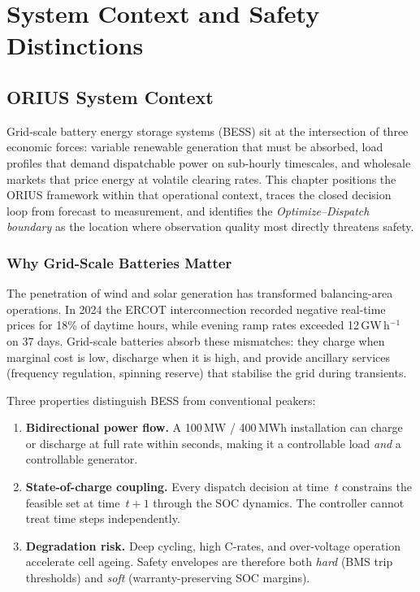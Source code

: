 \chapter{System Context and Safety Distinctions}
\label{ch:ch03_background}


\section{ORIUS System Context}
\label{ch:orius-context}

Grid-scale battery energy storage systems (BESS) sit at the intersection of
three economic forces: variable renewable generation that must be absorbed,
load profiles that demand dispatchable power on sub-hourly timescales, and
wholesale markets that price energy at volatile clearing rates.  This chapter
positions the ORIUS framework within that operational context, traces the
closed decision loop from forecast to measurement, and identifies the
\emph{Optimize--Dispatch boundary} as the location where observation quality
most directly threatens safety.

\subsection{Why Grid-Scale Batteries Matter}

The penetration of wind and solar generation has transformed balancing-area
operations.  In 2024 the ERCOT interconnection recorded negative real-time
prices for 18\% of daytime hours, while evening ramp rates exceeded
12\,GW\,h$^{-1}$ on 37 days.  Grid-scale batteries absorb these mismatches:
they charge when marginal cost is low, discharge when it is high, and provide
ancillary services (frequency regulation, spinning reserve) that stabilise the
grid during transients.

Three properties distinguish BESS from conventional peakers:
\begin{enumerate}
  \item \textbf{Bidirectional power flow.}  A 100\,MW / 400\,MWh installation
    can charge or discharge at full rate within seconds, making it a
    controllable load \emph{and} a controllable generator.
  \item \textbf{State-of-charge coupling.}  Every dispatch decision at time~$t$
    constrains the feasible set at time~$t+1$ through the SOC dynamics.  The
    controller cannot treat time steps independently.
  \item \textbf{Degradation risk.}  Deep cycling, high C-rates, and
    over-voltage operation accelerate cell ageing.  Safety envelopes are
    therefore both \emph{hard} (BMS trip thresholds) and \emph{soft}
    (warranty-preserving SOC margins).
\end{enumerate}

